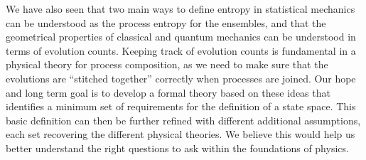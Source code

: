 \documentclass[letterpaper,twocolumn]{article}
\begin{document}
We have also seen that two main ways to define entropy in statistical mechanics can be understood as the process entropy for the ensembles, and that the geometrical properties of classical and quantum mechanics can be understood in terms of evolution counts. Keeping track of evolution counts is fundamental in a physical theory for process composition, as we need to make sure that the evolutions are ``stitched together'' correctly when processes are joined. Our hope and long term goal is to develop a formal theory based on these ideas that identifies a minimum set of requirements for the definition of a state space. This basic definition can then be further refined with different additional assumptions, each set recovering the different physical theories. We believe this would help us better understand the right questions to ask within the foundations of physics.


\end{document}
